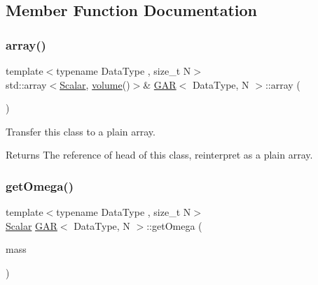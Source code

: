 \subsection{Member Function Documentation}
\mbox{\label{class_g_a_r_a152aa5eea95fe568b010d85a7ba23bf7}} 
\subsubsection{\texorpdfstring{array()}{array()}}
{\footnotesize\ttfamily template$<$typename Data\+Type , size\+\_\+t N$>$ \\
std\+::array$<$\mbox{\hyperlink{class_g_a_r_a2ae44eda8e28d5dd26cf707dcda69314}{Scalar}}, \mbox{\hyperlink{class_g_a_r_abdbcc31db058125bd2ee207e7648b20b}{volume}}()$>$\& \mbox{\hyperlink{class_g_a_r}{G\+AR}}$<$ Data\+Type, N $>$\+::array (\begin{DoxyParamCaption}{ }\end{DoxyParamCaption})\hspace{0.3cm}{\ttfamily [inline]}}



Transfer this class to a plain array. 

\begin{DoxyReturn}{Returns}
The reference of head of this class, reinterpret as a plain array. 
\end{DoxyReturn}
\mbox{\label{class_g_a_r_a3d5871f25d147497399fa65343bca84a}} 
\subsubsection{\texorpdfstring{get\+Omega()}{getOmega()}}
{\footnotesize\ttfamily template$<$typename Data\+Type , size\+\_\+t N$>$ \\
\mbox{\hyperlink{class_g_a_r_a2ae44eda8e28d5dd26cf707dcda69314}{Scalar}} \mbox{\hyperlink{class_g_a_r}{G\+AR}}$<$ Data\+Type, N $>$\+::get\+Omega (\begin{DoxyParamCaption}\item[{const \mbox{\hyperlink{class_g_a_r_a0b446684ae922457a3bf86c904085d8a}{Scalar\+Array}} \&}]{mass }\end{DoxyParamCaption})\hspace{0.3cm}{\ttfamily [inline]}}




